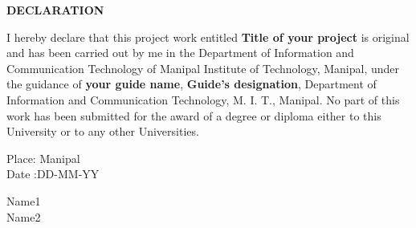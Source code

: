 \begin{center}
\large{\textbf{DECLARATION}}\\
\vspace{1cm}
\end{center}

I hereby declare that this project work entitled \textbf{Title of your project} is original and has been carried out by
me in the Department of Information and Communication Technology of Manipal Institute of Technology, Manipal, under the guidance of \textbf{your guide name}, \textbf{Guide's designation}, Department of Information and Communication Technology, M. I. T., Manipal. No part of this work has been submitted for the award of a degree or diploma either to this University or to any other Universities.



\vspace{2cm}

\begin{flushleft}
Place: Manipal\\
Date :DD-MM-YY
\end{flushleft}


\begin{flushright}
Name1\\
Name2
\end{flushright}